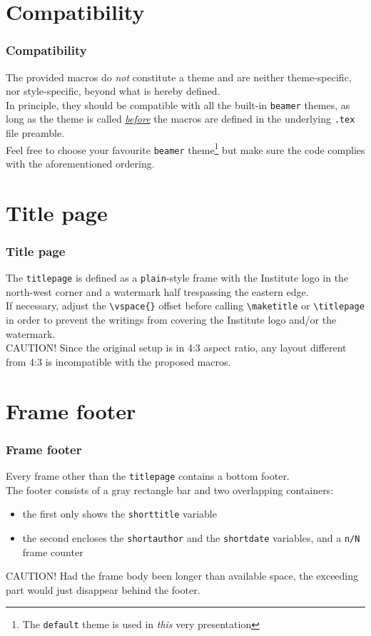 \documentclass[english]{beamer}
\begin{document}
\section{Compatibility}

\begin{frame}
\frametitle{Compatibility}
The provided macros do \emph{not} constitute a theme and are neither theme-specific, nor style-specific, beyond what is hereby defined.\\
\bigskip 
In principle, they should be compatible with all the built-in \texttt{beamer} themes, as long as the theme is called \underline{\emph{before}} the macros are defined in the underlying \texttt{.tex} file preamble.\\
\bigskip
Feel free to choose your favourite \texttt{beamer} theme\footnote{The \texttt{default} theme is used in \emph{this} very presentation} but make sure the code complies with the aforementioned ordering.
\end{frame}

\section{Title page}

\begin{frame}[fragile]
\frametitle{Title page}
The \texttt{titlepage} is defined as a \texttt{plain}-style frame with the Institute logo in the north-west corner and a watermark half trespassing the eastern edge.\\
\bigskip
If necessary, adjust the \verb|\vspace{}| offset before calling \verb|\maketitle| or \verb|\titlepage| in order to prevent the writings from covering the Institute logo and/or the watermark.\\
\bigskip
CAUTION! Since the original setup is in 4:3 aspect ratio, any layout different from 4:3 is incompatible with the proposed macros.
\end{frame}

\section{Frame footer}

\begin{frame}
\frametitle{Frame footer}
Every frame other than the \texttt{titlepage} contains a bottom footer.\\
\bigskip
The footer consists of a gray rectangle bar and two overlapping containers:
\begin{itemize}
\item the first only shows the \texttt{shorttitle} variable\
\item the second encloses the \texttt{shortauthor} and the \texttt{shortdate} variables, and a \texttt{n/N} frame counter
\end{itemize}
\bigskip
CAUTION! Had the frame body been longer than available space, the exceeding part would just disappear behind the footer.
\end{frame}
\end{document}
